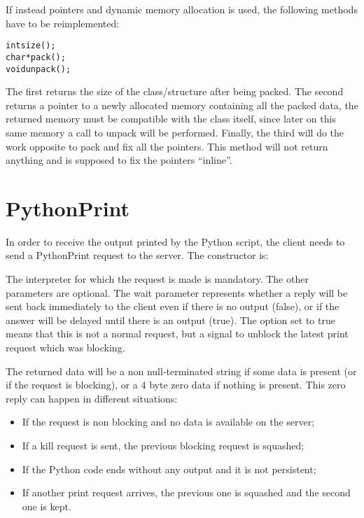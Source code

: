 If instead pointers and dynamic memory allocation is used, the following methods
have to be reimplemented:

\begin{alltt}
int size();
char * pack();
void unpack();
\end{alltt}

The first returns the size of the class/structure after being packed. The second
returns a pointer to a newly allocated memory containing all the packed data,
the returned memory must be compatible with the class itself, since later on
this same memory a call to unpack will be performed. Finally, the third will do
the work opposite to pack and fix all the pointers. This method will not return
anything and is supposed to fix the pointers ``inline''.

\section{PythonPrint}
\label{pythonPrint}

In order to receive the output printed by the Python script, the client needs to
send a PythonPrint request to the server. The constructor is:


The interpreter for which the request is made is mandatory. The other parameters
are optional. The wait parameter represents whether a reply will be sent back
immediately to the client even if there is no output (false), or if the answer
will be delayed until there is an output (true). The  option set to
true means that this is not a normal request, but a signal to unblock the latest
print request which was blocking.

The returned data will be a non null-terminated string if some data is present
(or if the request is blocking), or a 4 byte zero data if nothing is present.
This zero reply can happen in different situations:

\begin{itemize}
\item If the request is non blocking and no data is available on the server;
\item If a kill request is sent, the previous blocking request is squashed;
\item If the Python code ends without any output and it is not persistent;
\item If another print request arrives, the previous one is squashed and the second one is kept.
\end{itemize}

